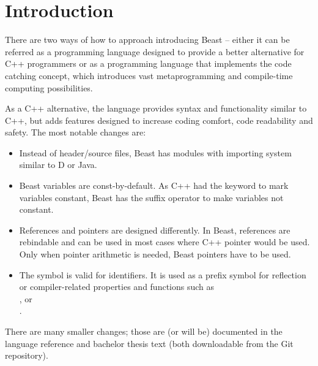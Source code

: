\documentclass{ExcelAtFIT}
\affiliation{*%
  \href{mailto: xcejch00@stud.fit.vutbr.cz}{xcejch00@stud.fit.vutbr.cz},
  \textit{Faculty of Information Technology, Brno University of Technology}}
\begin{document}
\startdocument



\section{Introduction}

There are two ways of how to approach introducing Beast -- either it can be referred as a programming language designed to provide a better alternative for C++ programmers or as a programming language that implements the code catching concept, which introduces vast metaprogramming and compile-time computing possibilities.

As a C++ alternative, the language provides syntax and functionality similar to C++, but adds features designed to increase coding comfort, code readability and safety. The most notable changes are:
\begin{itemize}
	\item Instead of header/source files, Beast has modules with importing system similar to D or Java.
	\item Beast variables are const-by-default. As C++ had the  keyword to mark variables constant, Beast has the  suffix operator to make variables not constant.
	\item References and pointers are designed differently. In Beast, references are rebindable and can be used in most cases where C++ pointer would be used. Only when pointer arithmetic is needed, Beast pointers have to be used.
	\item The \inlineCode{#} symbol is valid for identifiers. It is used as a prefix symbol for reflection or compiler-related properties and functions such as \\,  or \\.
\end{itemize}

There are many smaller changes; those are (or will be) documented in the language reference and bachelor thesis text (both downloadable from the Git repository).
\end{document}
